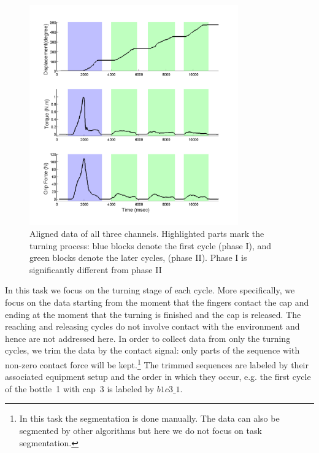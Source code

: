 \begin{figure}
  \centering
  \hspace{-0.5cm}
  \includegraphics[width=9cm]{./fig/b3c2_1_sTF.pdf}
  \vspace{-0.5cm}
  \caption{ \scriptsize{Aligned data of all three
      channels. Highlighted parts mark the turning process: blue
      blocks denote the first cycle (phase I), and green
      blocks denote the later cycles, (phase II). Phase I is
      significantly different from phase II}
}
\label{fig:3channels}
\end{figure}

In this task we focus on the turning stage of each cycle. More
specifically, we focus on the data starting from the moment that the
fingers contact the cap and ending at the moment that the turning is
finished and the cap is released. The reaching and releasing cycles do
not involve contact with the environment and hence are not addressed
here.
In order to collect data from only the turning cycles, we trim the
data by the contact signal: only parts of the sequence with non-zero
contact force will be kept.\footnote{In this task the segmentation is
  done manually. The data can also be segmented by other algorithms
  but here we do not focus on task segmentation.} The trimmed
sequences are labeled by their associated equipment setup and the
order in which they occur, e.g. the first cycle of the bottle~1 with
cap~3 is labeled by $b1c3\_1$.

